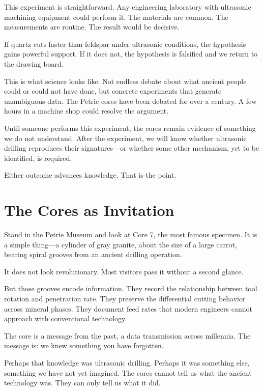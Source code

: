 \documentclass[11pt]{article}
\begin{document}
This experiment is straightforward. Any engineering laboratory with ultrasonic machining equipment could perform it. The materials are common. The measurements are routine. The result would be decisive.

If quartz cuts faster than feldspar under ultrasonic conditions, the hypothesis gains powerful support. If it does not, the hypothesis is falsified and we return to the drawing board.

This is what science looks like. Not endless debate about what ancient people could or could not have done, but concrete experiments that generate unambiguous data. The Petrie cores have been debated for over a century. A few hours in a machine shop could resolve the argument.

Until someone performs this experiment, the cores remain evidence of something we do not understand. After the experiment, we will know whether ultrasonic drilling reproduces their signatures---or whether some other mechanism, yet to be identified, is required.

Either outcome advances knowledge. That is the point.

\section{The Cores as Invitation}

Stand in the Petrie Museum and look at Core 7, the most famous specimen. It is a simple thing---a cylinder of gray granite, about the size of a large carrot, bearing spiral grooves from an ancient drilling operation.

It does not look revolutionary. Most visitors pass it without a second glance.

But those grooves encode information. They record the relationship between tool rotation and penetration rate. They preserve the differential cutting behavior across mineral phases. They document feed rates that modern engineers cannot approach with conventional technology.

The core is a message from the past, a data transmission across millennia. The message is: we knew something you have forgotten.

Perhaps that knowledge was ultrasonic drilling. Perhaps it was something else, something we have not yet imagined. The cores cannot tell us what the ancient technology was. They can only tell us what it did.
\end{document}
